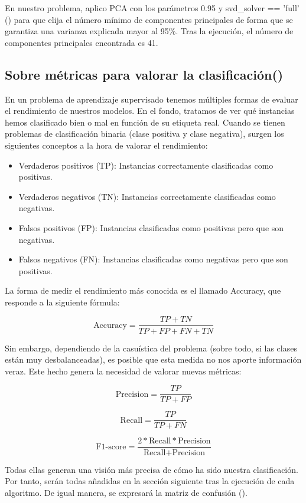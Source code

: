 En nuestro problema, aplico PCA con los parámetros 0.95 y svd\_solver == 'full' (\cite{pca-sk}) para que elija el número mínimo de componentes principales de forma que se garantiza una varianza explicada mayor al 95\%. Tras la ejecución, el número de componentes principales encontrada es 41.

\subsection{Sobre métricas para valorar la clasificación(\cite{seleccion-metricas})}

En un problema de aprendizaje supervisado tenemos múltiples formas de evaluar el rendimiento de nuestros modelos. En el fondo, tratamos de ver qué instancias hemos clasificado bien o mal en función de su etiqueta real. Cuando se tienen problemas de clasificación binaria (clase positiva y clase negativa), surgen los siguientes conceptos a la hora de valorar el rendimiento:

\begin{itemize}
	\item Verdaderos positivos (TP): Instancias correctamente clasificadas como positivas.
	\item Verdaderos negativos (TN): Instancias correctamente clasificadas como negativas.
	\item Falsos positivos (FP): Instancias clasificadas como positivas pero que son negativas.
	\item Falsos negativos (FN): Instancias clasificadas como negativas pero que son positivas.
\end{itemize}

La forma de medir el rendimiento más conocida es el llamado Accuracy, que responde a la siguiente fórmula:

$$\text{Accuracy} = \frac{TP+TN}{TP+FP+FN+TN}$$

Sin embargo, dependiendo de la casuística del problema (sobre todo, si las clases están muy desbalanceadas), es posible que esta medida no nos aporte información veraz. Este hecho genera la necesidad de valorar nuevas métricas:

$$\text{Precision} = \frac{TP}{TP+FP}$$

$$\text{Recall} = \frac{TP}{TP+FN}$$

$$\text{F1-score} = \frac{2*\text{Recall}*\text{Precision}}{\text{Recall}+\text{Precision}}$$

Todas ellas generan una visión más precisa de cómo ha sido nuestra clasificación. Por tanto, serán todas añadidas en la sección siguiente tras la ejecución de cada algoritmo. De igual manera, se expresará la matriz de confusión (\cite{cf}).

